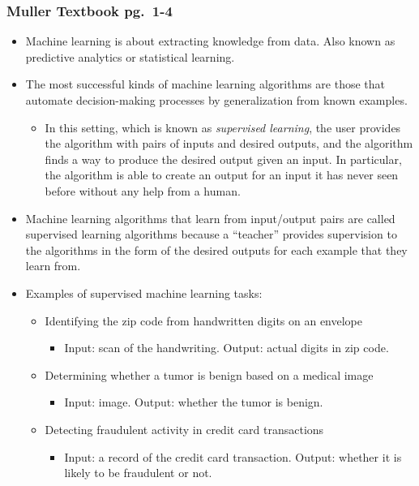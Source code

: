 \documentclass{article}
\begin{document}
\subsubsection*{Muller Textbook pg.\ 1-4}
\begin{itemize}
    \item Machine learning is about extracting knowledge from data. Also known as predictive analytics or statistical learning.
    \item The most successful kinds of machine learning algorithms are those that automate decision-making processes by generalization from known examples.
    \begin{itemize}
        \item In this setting, which is known as \textit{supervised learning}, the user provides the algorithm with pairs of inputs and desired outputs, and the algorithm finds a way to produce the desired output given an input. In particular, the algorithm is able to create an output for an input it has never seen before without any help from a human.
    \end{itemize}
    \item Machine learning algorithms that learn from input/output pairs are called supervised learning algorithms because a ``teacher'' provides supervision to the algorithms in the form of the desired outputs for each example that they learn from.
    \item Examples of supervised machine learning tasks:
    \begin{itemize}
        \item Identifying the zip code from handwritten digits on an envelope
        \begin{itemize}
            \item Input: scan of the handwriting. Output: actual digits in zip code.
        \end{itemize}
        \item Determining whether a tumor is benign based on a medical image
        \begin{itemize}
            \item Input: image. Output: whether the tumor is benign.
        \end{itemize}
        \item Detecting fraudulent activity in credit card transactions
        \begin{itemize}
            \item Input: a record of the credit card transaction. Output: whether it is likely to be fraudulent or not.

\end{itemize}
\end{itemize}
\end{itemize}
\end{document}
